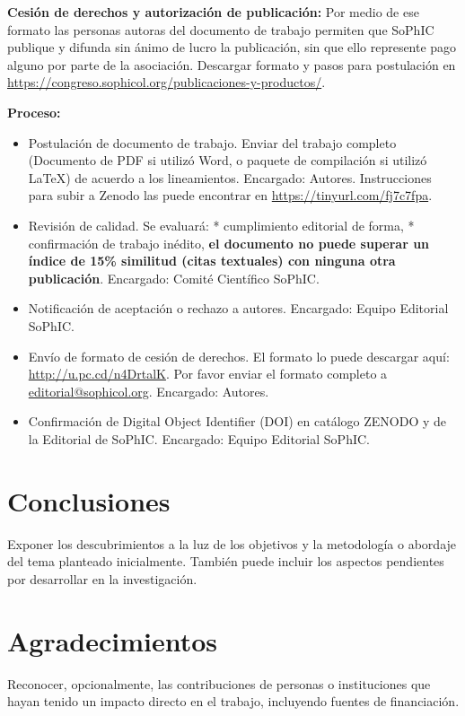 \documentclass{sophicart}
\begin{document}
\textbf{Cesión de derechos y autorización de publicación:} Por medio de ese formato las personas autoras del documento de trabajo permiten que SoPhIC publique y difunda sin ánimo de lucro la publicación, sin que ello represente pago alguno por parte de la asociación. Descargar formato y pasos para postulación en \url{https://congreso.sophicol.org/publicaciones-y-productos/}. 

\textbf{Proceso:}

\begin{itemize}
\item Postulación de documento de trabajo. Enviar del trabajo completo (Documento de PDF si utilizó Word, o paquete de compilación si utilizó \LaTeX\xspace) de acuerdo a los lineamientos. Encargado: Autores. Instrucciones para subir a Zenodo las puede encontrar en \url{https://tinyurl.com/fj7c7fpa}.
\item Revisión de calidad. Se evaluará: * cumplimiento editorial de forma, * confirmación de trabajo inédito, \textbf{el documento no puede superar un índice de 15\% similitud (citas textuales) con ninguna otra publicación}. Encargado: Comité Científico SoPhIC. 
\item  Notificación de aceptación o rechazo a autores. Encargado: Equipo Editorial SoPhIC. 
\item  Envío de formato de cesión de derechos. El formato lo puede descargar aquí: \url{http://u.pc.cd/n4DrtalK}. Por favor enviar el formato completo a \href{mailto:editorial@sophicol.org}{editorial@sophicol.org}. Encargado: Autores.
\item  Confirmación de Digital Object Identifier (DOI) en catálogo ZENODO y de la Editorial de SoPhIC. Encargado: Equipo Editorial SoPhIC. 
\end{itemize}

\section{Conclusiones}
Exponer los descubrimientos a la luz de los objetivos y la metodología o abordaje del tema planteado inicialmente. También puede incluir los aspectos pendientes por desarrollar en la investigación. 

\section{Agradecimientos}
Reconocer, opcionalmente, las contribuciones de personas o instituciones que hayan tenido un impacto directo en el trabajo, incluyendo fuentes de financiación. 

\printbibliography %
\end{document}
